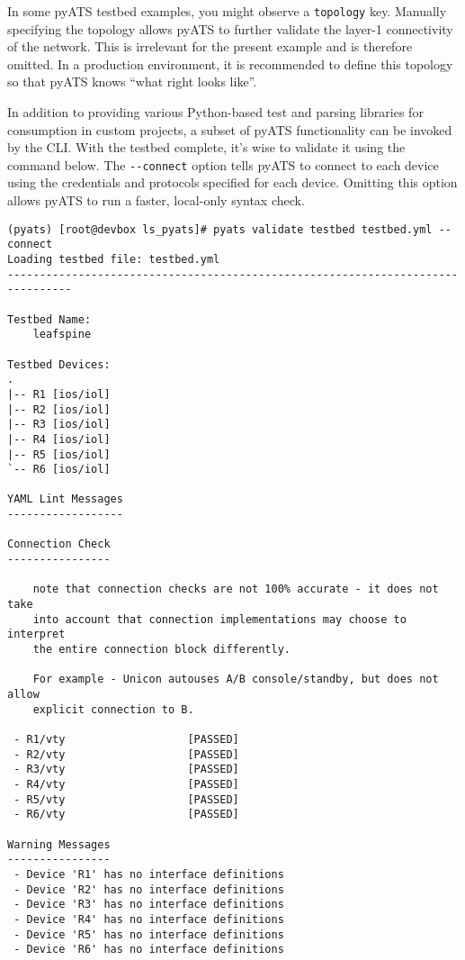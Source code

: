 In some pyATS testbed examples, you might observe a \verb|topology| key.
Manually specifying the topology allows pyATS to further validate the layer-1
connectivity of the network. This is irrelevant for the present example
and is therefore omitted. In a production environment, it is recommended to
define this topology so that pyATS knows ``what right looks like''.

In addition to providing various Python-based test and parsing libraries
for consumption in custom projects, a subset of pyATS functionality can be
invoked by the CLI\@. With the testbed complete, it's wise to validate it
using the command below. The \verb|--connect| option tells pyATS to connect
to each device using the credentials and protocols specified for each device.
Omitting this option allows pyATS to run a faster, local-only syntax check.

\begin{verbatim}
(pyats) [root@devbox ls_pyats]# pyats validate testbed testbed.yml --connect
Loading testbed file: testbed.yml
--------------------------------------------------------------------------------

Testbed Name:
    leafspine

Testbed Devices:
.
|-- R1 [ios/iol]
|-- R2 [ios/iol]
|-- R3 [ios/iol]
|-- R4 [ios/iol]
|-- R5 [ios/iol]
`-- R6 [ios/iol]

YAML Lint Messages
------------------

Connection Check
----------------

    note that connection checks are not 100% accurate - it does not take
    into account that connection implementations may choose to interpret
    the entire connection block differently.

    For example - Unicon autouses A/B console/standby, but does not allow
    explicit connection to B.

 - R1/vty                   [PASSED]
 - R2/vty                   [PASSED]
 - R3/vty                   [PASSED]
 - R4/vty                   [PASSED]
 - R5/vty                   [PASSED]
 - R6/vty                   [PASSED]

Warning Messages
----------------
 - Device 'R1' has no interface definitions
 - Device 'R2' has no interface definitions
 - Device 'R3' has no interface definitions
 - Device 'R4' has no interface definitions
 - Device 'R5' has no interface definitions
 - Device 'R6' has no interface definitions
\end{verbatim}

